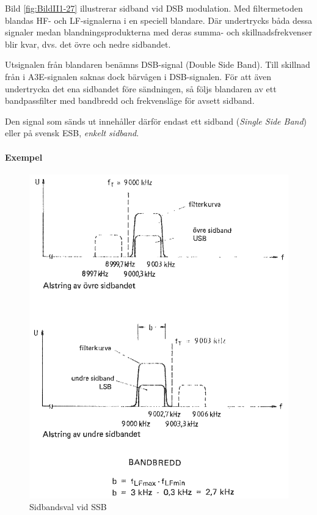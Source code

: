 Bild \ref{fig:BildII1-27} illustrerar sidband vid DSB modulation.
Med filtermetoden blandas HF- och LF-signalerna i en speciell blandare.
Där undertrycks båda dessa signaler medan blandningsprodukterna med deras summa-
och skillnadsfrekvenser blir kvar, dvs. det övre och nedre sidbandet.

Utsignalen från blandaren benämns DSB-signal (Double Side Band).
Till skillnad från i A3E-signalen saknas dock bärvågen i DSB-signalen.
För att även undertrycka det ena sidbandet före sändningen, så följs blandaren
av ett bandpassfilter med bandbredd och frekvensläge för avsett sidband.

Den signal som sänds ut innehåller därför endast ett sidband (\emph{Single Side Band}) eller på svensk ESB, \emph{enkelt sidband}.

\paragraph{Exempel}

\begin{figure}
	\includegraphics[width=\textwidth]{images/cropped_pdfs/bild_2_1-28.pdf}
	\caption{Sidbandsval vid SSB}
	\label{fig:BildII1-28}
\end{figure}


